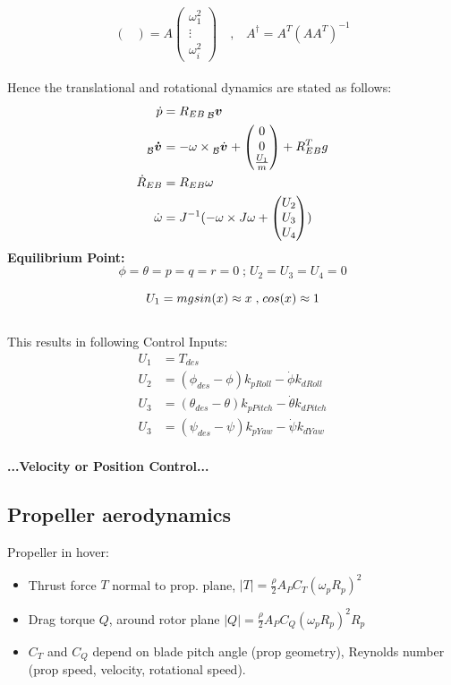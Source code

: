 \documentclass[a4paper, 8pt]{extarticle}
\newcommand{\mvec}[3]{  \prescript{}{\mathcal{#1}}{\bm{#2}}  _{#3} }
\newcommand{\mdvec}[3]{ \prescript{}{\mathcal{#1}}{\dot{\bm #2}} _{#3} }
\begin{document}
\begin{multicols*}{3}
$$\begin{pmatrix}
\end{pmatrix}=A\begin{pmatrix}
\omega_{1}^2 \\
\vdots \\
\omega_{i}^2
\end{pmatrix} \quad \textrm{,} \quad A^{\dagger}= A^T(AA^T)^{-1}
$$\\
Hence the translational and rotational dynamics are stated as follows:
\begin{align*}
\dot{p} &= R_{EB} \mvec{B}{v}{}\\
\mvec{B}{\dot{v}}{} &=-\omega \times \mdvec{B}{v}{}+\begin{pmatrix}
0 \\ 0 \\ \frac{U_{1}}{m}
\end{pmatrix}+R_{EB}^T g\\
\dot{R}_{EB} &= R_{EB} \omega\\
\dot{\omega} &= J^{-1}(-\omega \times J\omega+\begin{pmatrix}
U_2 \\ U_3 \\ U_4
\end{pmatrix}
)
\end{align*}
\textbf{Equilibrium Point:}\\
$$ \phi=\theta=p=q=r=0 \; \textrm{;} \; U_2=U_3=U_4=0$$

$$U_{1}=mg\\
sin(x) \approx x \; \textrm{,} \; cos(x) \approx 1$$\\
This results in following Control Inputs:
\begin{align*}
    U_1 &= T_{des}\\
    U_2 &= (\phi_{des}-\phi)k_{pRoll}-\dot{\phi}k_{dRoll}\\
    U_3 &= (\theta_{des}-\theta)k_{pPitch}-\dot{\theta}k_{dPitch}\\
    U_3 &= (\psi_{des}-\psi)k_{pYaw}-\dot{\psi}k_{dYaw}\\
\end{align*}

\textbf{...Velocity or Position Control...}


\subsection{Propeller aerodynamics}
Propeller in hover:
\begin{itemize}
\item Thrust force $T$ normal to prop. plane, $|T| = \frac{\rho}{2} A_P C_T(\omega_p R_p)^2$
\item Drag torque $Q$, around rotor plane $|Q| = \frac{\rho}{2} A_P C_Q(\omega_p R_p)^2R_p$
\item $C_T$ and $C_Q$ depend on blade pitch angle (prop geometry), Reynolds number (prop speed, velocity, rotational speed).
\end{itemize}


\end{multicols*}
\end{document}
